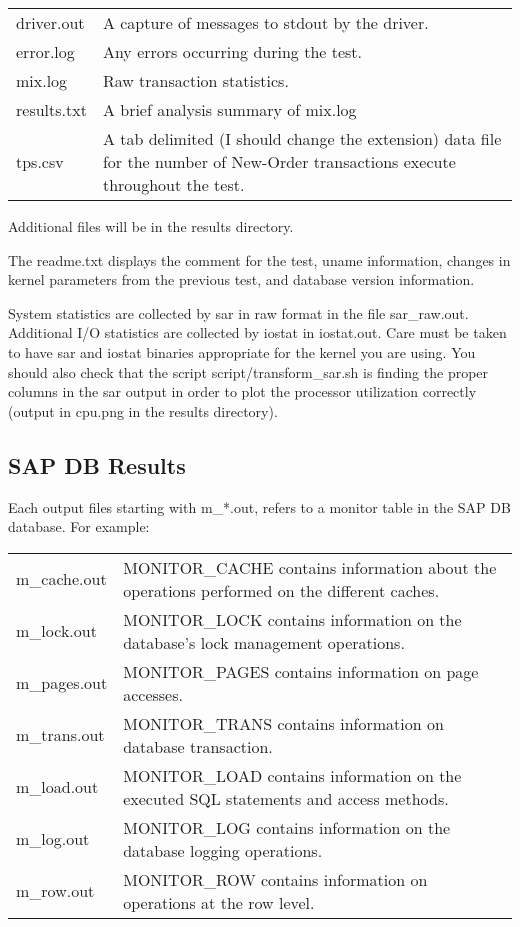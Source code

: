 \documentclass{article}
\begin{document}
\begin{tabular}[c]{ll}
driver.out	&	A capture of messages to stdout by the driver. \\
error.log	&	Any errors occurring during the test. \\
mix.log		&	Raw transaction statistics. \\
results.txt	&	A brief analysis summary of mix.log \\
tps.csv		&	A tab delimited (I should change the extension) data
			file for the number of New-Order transactions execute
			throughout the test. \\
\end{tabular}

\noindent
Additional files will be in the results directory.

\noindent
The readme.txt displays the comment for the test, uname  information, changes
in kernel parameters from the previous test, and database version information.

\noindent
System statistics are collected by sar in raw format in the file sar\_raw.out.
Additional I/O statistics are collected by iostat in iostat.out.  Care must be
taken to have sar and iostat binaries appropriate for the kernel you are
using.  You should also check that the script script/transform\_sar.sh is
finding the proper columns in the sar output in order to plot the processor
utilization correctly (output in cpu.png in the results directory).

\subsection{SAP DB Results}

Each output files starting with m\_*.out, refers to a monitor table in the
SAP DB database.  For example:

\begin{tabular}[c]{ll}
m\_cache.out	&	MONITOR\_CACHE contains information about the operations
			performed on the different caches. \\
m\_lock.out	&	MONITOR\_LOCK contains information on the database's
			lock management operations. \\
m\_pages.out	&	MONITOR\_PAGES contains information on page accesses. \\
m\_trans.out	&	MONITOR\_TRANS contains information on database
			transaction. \\
m\_load.out	&	MONITOR\_LOAD contains information on the executed SQL
			statements and access methods. \\
m\_log.out	&	MONITOR\_LOG contains information on the database
			logging operations. \\
m\_row.out	&	MONITOR\_ROW contains information on operations at the
			row level. \\
\end{tabular}
\end{document}
